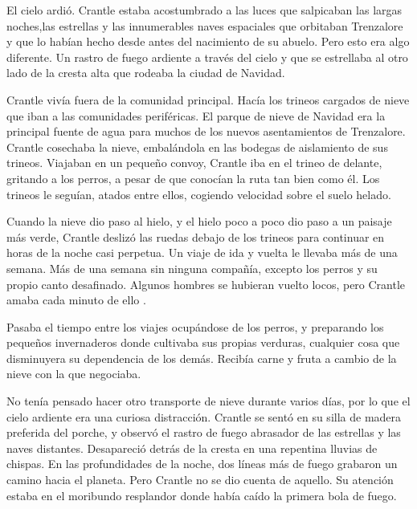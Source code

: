 El cielo ardió. Crantle estaba acostumbrado a las luces que salpicaban las largas noches,las estrellas y las innumerables naves espaciales que orbitaban Trenzalore y que lo habían hecho desde antes del nacimiento de su abuelo. Pero esto era algo diferente. Un rastro de fuego ardiente a través del cielo y que se estrellaba al otro lado de la cresta alta que rodeaba la ciudad de Navidad.



Crantle vivía fuera de la comunidad principal. Hacía los trineos cargados de nieve que iban a las comunidades periféricas. El parque de nieve de Navidad era la principal fuente de agua para muchos de los nuevos asentamientos de Trenzalore. Crantle cosechaba la nieve, embalándola en las bodegas de aislamiento de sus trineos. Viajaban en un pequeño convoy, Crantle iba en el trineo de delante, gritando a los perros, a pesar de que conocían la ruta tan bien como él. Los trineos le seguían, atados entre ellos, cogiendo velocidad sobre el suelo helado.



Cuando la nieve dio paso al hielo, y el hielo poco a poco dio paso a un paisaje más verde, Crantle deslizó las ruedas debajo de los trineos para continuar en horas de la noche casi perpetua. Un viaje de ida y vuelta le llevaba más de una semana. Más de una semana sin ninguna compañía, excepto los perros y su propio canto desafinado. Algunos hombres se hubieran vuelto locos, pero Crantle amaba cada minuto de ello .



Pasaba el tiempo entre los viajes ocupándose de los perros, y preparando los pequeños invernaderos donde cultivaba sus propias verduras, cualquier cosa que disminuyera su dependencia de los demás. Recibía carne y fruta a cambio de la nieve con la que negociaba.



No tenía pensado hacer otro transporte de nieve durante varios días, por lo que el cielo ardiente era una curiosa distracción. Crantle se sentó en su silla de madera preferida del porche, y observó el rastro de fuego abrasador de las estrellas y las naves distantes. Desapareció detrás de la cresta en una repentina lluvias de chispas. En las profundidades de la noche, dos líneas más de fuego grabaron un camino hacia el planeta. Pero Crantle no se dio cuenta de aquello. Su atención estaba en el moribundo resplandor donde había caído la primera bola de fuego.



